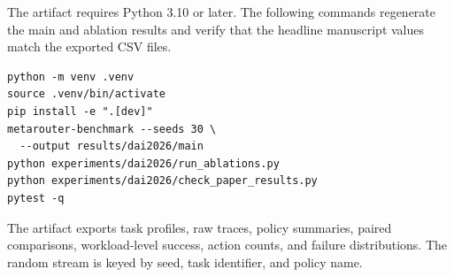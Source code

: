 \documentclass[sigconf]{acmart}
\begin{document}
The artifact requires Python 3.10 or later. The following commands regenerate the main and ablation results and verify that the headline manuscript values match the exported CSV files.

\begin{verbatim}
python -m venv .venv
source .venv/bin/activate
pip install -e ".[dev]"
metarouter-benchmark --seeds 30 \
  --output results/dai2026/main
python experiments/dai2026/run_ablations.py
python experiments/dai2026/check_paper_results.py
pytest -q
\end{verbatim}

The artifact exports task profiles, raw traces, policy summaries, paired comparisons, workload-level success, action counts, and failure distributions. The random stream is keyed by seed, task identifier, and policy name.
\end{document}
